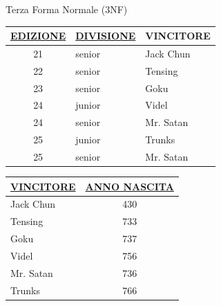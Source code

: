 \begin{frame}{Terza Forma Normale (3NF)}
    \begin{table}[h]
    \centering
    \begin{minipage}[t]{0.45\textwidth}
        \centering
        \begin{tabular}{| c | l | l |}
            \hline
            \rowcolor{cyan!30} \textbf{\underline{EDIZIONE}} & \textbf{\underline{DIVISIONE}} & \textbf{VINCITORE} \\ \hline
            21 & senior & Jack Chun \\ \hline
            22 & senior & Tensing \\ \hline
            23 & senior & Goku \\ \hline
            24 & junior & Videl \\ \hline
            24 & senior & Mr. Satan \\ \hline
            25 & junior & Trunks \\ \hline
            25 & senior & Mr. Satan \\ \hline
        \end{tabular}
    \end{minipage}
    \hspace{1cm} %
    \begin{minipage}[t]{0.45\textwidth}
        \centering
        \begin{tabular}{| l | c |}
            \hline
            \rowcolor{cyan!30} \textbf{\underline{VINCITORE}} & \textbf{\underline{ANNO NASCITA}} \\ \hline
            Jack Chun & 430 \\ \hline
            Tensing & 733 \\ \hline
            Goku & 737 \\ \hline
            Videl & 756 \\ \hline
            Mr. Satan & 736 \\ \hline
            Trunks & 766 \\ \hline
        \end{tabular}
    \end{minipage}
\end{table}
\end{frame}
%
